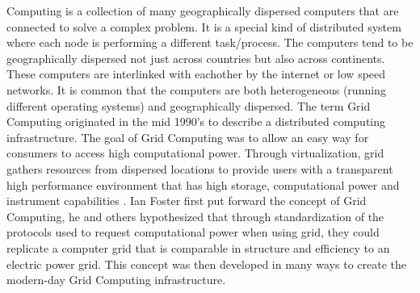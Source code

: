 \documentclass[10pt,journal,compsoc]{IEEEtran}
\begin{document}
 Computing is a collection of many geographically dispersed computers that are connected to solve a complex problem. It is a special kind of distributed system where each node is performing a different task/process. The computers tend to be geographically dispersed not just across countries but also across continents. These computers are interlinked with eachother by the internet or low speed networks. It is common that the computers are both heterogeneous (running different operating systems) and geographically dispersed. \cite{Wiki}
\newline \newline
The term Grid Computing originated in the mid 1990's to describe a distributed computing infrastructure. \cite{GridAndCloud} The goal of Grid Computing was to allow an easy way for consumers to access high computational power. \cite{GridNutShell} Through virtualization, grid gathers resources from dispersed locations to provide users with a transparent high performance environment that has high storage, computational power and instrument capabilities \cite{GridOrCloud}. 
\newline \newline
Ian Foster first put forward the concept of Grid Computing, he and others hypothesized that through standardization of the protocols used to request computational power when using grid, they could replicate a computer grid that is comparable in structure and efficiency to an electric power grid. This concept was then developed in many ways to create the modern-day Grid Computing infrastructure. \cite{GridAndCloud}
\newline \newline \newline
\end{document}
